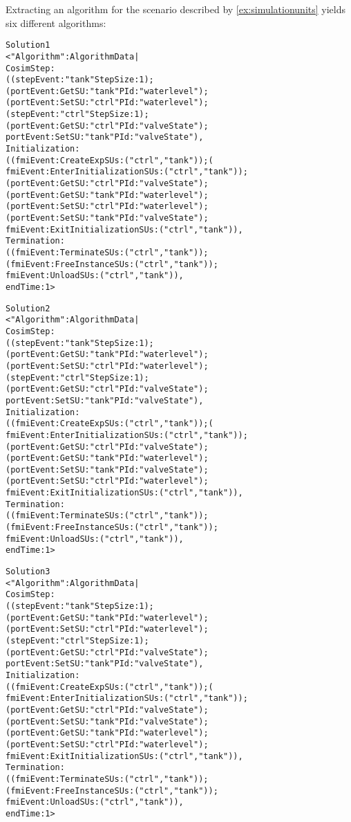 \begin{example}
  Extracting an algorithm for the scenario described by \cref{ex:simulationunits} yields six different algorithms:
\small
\begin{alltt}
Solution 1
{< "Algorithm" : AlgorithmData | 
CosimStep :
  ((stepEvent: "tank" StepSize: 1);
  (portEvent: Get SU: "tank" PId: "waterlevel");
  (portEvent: Set SU: "ctrl" PId: "waterlevel");
  (stepEvent: "ctrl" StepSize: 1);
  (portEvent: Get SU: "ctrl" PId: "valveState");
  portEvent: Set SU: "tank" PId: "valveState"),
Initialization :
  ((fmiEvent: CreateExp SUs:("ctrl", "tank"));(
  fmiEvent: EnterInitialization SUs:("ctrl", "tank"));
    (portEvent: Get SU: "ctrl" PId: "valveState");
    (portEvent: Get SU: "tank" PId: "waterlevel");
    (portEvent: Set SU: "ctrl" PId: "waterlevel");
    (portEvent: Set SU: "tank" PId: "valveState");
  fmiEvent: ExitInitialization SUs:("ctrl", "tank")),
Termination :
  ((fmiEvent: Terminate SUs:("ctrl", "tank"));
  (fmiEvent: FreeInstance SUs:("ctrl", "tank"));
  fmiEvent: Unload SUs:("ctrl", "tank")),
endTime : 1 >}

Solution 2
{< "Algorithm" : AlgorithmData | 
CosimStep :
  ((stepEvent: "tank" StepSize: 1);
  (portEvent: Get SU: "tank" PId: "waterlevel");
  (portEvent: Set SU: "ctrl" PId: "waterlevel");
  (stepEvent: "ctrl" StepSize: 1);
  (portEvent: Get SU: "ctrl" PId: "valveState");
  portEvent: Set SU: "tank" PId: "valveState"),
Initialization :
  ((fmiEvent: CreateExp SUs:("ctrl", "tank"));(
  fmiEvent: EnterInitialization SUs:("ctrl", "tank"));
    (portEvent: Get SU: "ctrl" PId: "valveState");
    (portEvent: Get SU: "tank" PId: "waterlevel");
    (portEvent: Set SU: "tank" PId: "valveState");
    (portEvent: Set SU: "ctrl" PId: "waterlevel");
  fmiEvent: ExitInitialization SUs:("ctrl", "tank")),
Termination :
  ((fmiEvent: Terminate SUs:("ctrl", "tank"));
  (fmiEvent: FreeInstance SUs:("ctrl", "tank"));
  fmiEvent: Unload SUs:("ctrl", "tank")),
endTime : 1 >}


Solution 3
{< "Algorithm" : AlgorithmData | 
CosimStep :
  ((stepEvent: "tank" StepSize: 1);
  (portEvent: Get SU: "tank" PId: "waterlevel");
  (portEvent: Set SU: "ctrl" PId: "waterlevel");
  (stepEvent: "ctrl" StepSize: 1);
  (portEvent: Get SU: "ctrl" PId: "valveState");
  portEvent: Set SU: "tank" PId: "valveState"),
Initialization :
  ((fmiEvent: CreateExp SUs:("ctrl", "tank"));(
  fmiEvent: EnterInitialization SUs:("ctrl", "tank"));
    (portEvent: Get SU: "ctrl" PId: "valveState");
    (portEvent: Set SU: "tank" PId: "valveState");
    (portEvent: Get SU: "tank" PId: "waterlevel");
    (portEvent: Set SU: "ctrl" PId: "waterlevel");
  fmiEvent: ExitInitialization SUs:("ctrl", "tank")),
Termination :
  ((fmiEvent: Terminate SUs:("ctrl", "tank"));
  (fmiEvent: FreeInstance SUs:("ctrl", "tank"));
  fmiEvent: Unload SUs:("ctrl", "tank")),
endTime : 1 >}


\end{alltt}
\end{example}
